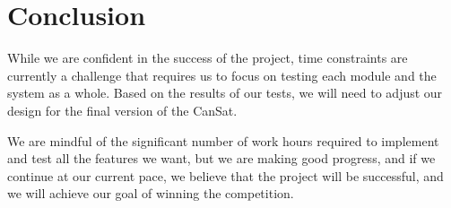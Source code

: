 \section{Conclusion}

While we are confident in the success of the project, time constraints are currently a challenge that requires us to focus on testing each module and the system as a whole. Based on the results of our tests, we will need to adjust our design for the final version of the CanSat. 

We are mindful of the significant number of work hours required to implement and test all the features we want, but we are making good progress, and if we continue at our current pace, we believe that the project will be successful, and we will achieve our goal of winning the competition.


